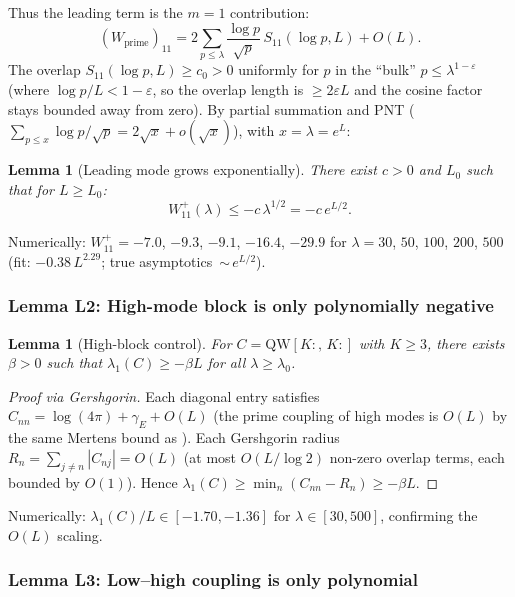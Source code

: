 \documentclass[12pt,a4paper]{article}
\newtheorem{lemma}[theorem]{Lemma}
\theoremstyle{definition}
\theoremstyle{remark}
\begin{document}
Thus the leading term is the $m = 1$ contribution:
\begin{equation}
\label{eq:W11-m1}
  (W_{\mathrm{prime}})_{11} = 2\sum_{p \leq \lambda} \frac{\log p}{\sqrt{p}}\,S_{11}(\log p, L) + O(L).
\end{equation}
The overlap $S_{11}(\log p, L) \geq c_0 > 0$ uniformly for $p$ in the ``bulk'' $p \leq \lambda^{1-\varepsilon}$ (where $\log p / L < 1 - \varepsilon$, so the overlap length is $\geq 2\varepsilon L$ and the cosine factor stays bounded away from zero). By partial summation and PNT ($\sum_{p \leq x} \log p / \sqrt{p} = 2\sqrt{x} + o(\sqrt{x})$), with $x = \lambda = e^L$:

\begin{lemma}[Leading mode grows exponentially]
\label{lem:L1}
There exist $c > 0$ and $L_0$ such that for $L \geq L_0$:
\[
  W_{11}^+(\lambda) \leq -c\,\lambda^{1/2} = -c\,e^{L/2}.
\]
\end{lemma}

\noindent Numerically: $W_{11}^+ = -7.0$, $-9.3$, $-9.1$, $-16.4$, $-29.9$ for $\lambda = 30$, $50$, $100$, $200$, $500$ (fit: $-0.38\,L^{2.29}$; true asymptotics~${\sim}\, e^{L/2}$).

\subsubsection{Lemma L2: High-mode block is only polynomially negative}

\begin{lemma}[High-block control]
\label{lem:L2}
For $C = \mathrm{QW}[K{:},\,K{:}]$ with $K \geq 3$, there exists $\beta > 0$ such that $\lambda_1(C) \geq -\beta L$ for all $\lambda \geq \lambda_0$.
\end{lemma}
\begin{proof}[Proof via Gershgorin]
Each diagonal entry satisfies $C_{nn} = \log(4\pi) + \gamma_E + O(L)$ (the prime coupling of high modes is $O(L)$ by the same Mertens bound as ). Each Gershgorin radius $R_n = \sum_{j \neq n} |C_{nj}| = O(L)$ (at most $O(L/\log 2)$ non-zero overlap terms, each bounded by $O(1)$). Hence $\lambda_1(C) \geq \min_n(C_{nn} - R_n) \geq -\beta L$.
\end{proof}

\noindent Numerically: $\lambda_1(C)/L \in [-1.70, -1.36]$ for $\lambda \in [30, 500]$, confirming the $O(L)$ scaling.

\subsubsection{Lemma L3: Low--high coupling is only polynomial}
\end{document}
